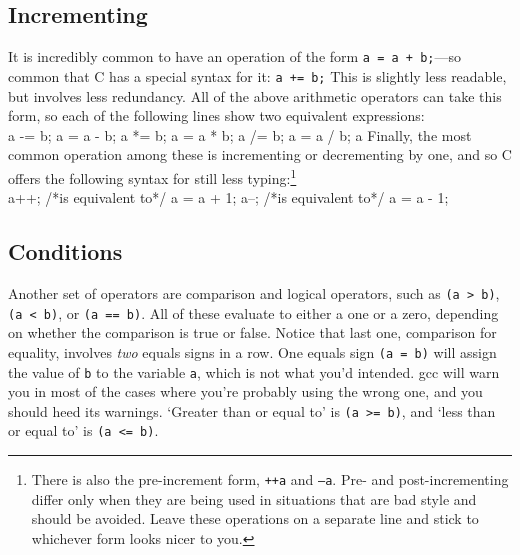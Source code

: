 \documentclass[12pt]{article}
\makeatletter
\def\ttindex#1{\index{#1@{\tt #1}}}
\makeatother
\begin{document}
\subsection{Incrementing} It is incredibly common to have an operation of the form {\tt a = a + b;}---so
common that C has a special syntax for it: {\tt a += b;} This is slightly less readable, but involves less
redundancy. All of the above arithmetic operators can take this form, so each of the following lines show two
equivalent expressions: \\
a -= b;     a = a - b;
a *= b;     a = a * b;
a /= b;     a = a / b;
a %
Finally, the most common operation among these is incrementing or decrementing by one, and so C offers the
following syntax for still less typing:\footnote{There is also the pre-increment form, {\tt ++a} and
{\tt --a}. Pre- and post-incrementing differ only when they are being used in situations that are bad style and should
be avoided. Leave these operations on a separate line and stick to whichever form looks nicer to you.} \\
a++; /*is equivalent to*/ a = a + 1;
a--; /*is equivalent to*/ a = a - 1;



\subsection{Conditions} 	
\label{forloops}    
\ttindex{<} \ttindex{>} \ttindex{==}
Another set of operators are comparison and logical operators, such as {\tt (a > b)},
{\tt (a < b)}, or {\tt (a == b)}. All of these evaluate to either a one or a zero, depending on whether the
comparison is true or false. Notice that last one, comparison for equality, involves {\sl two} equals
signs in a row. One equals sign {\tt (a = b)} will assign the value of {\tt b} to the variable {\tt a}, which is not what
you'd intended. gcc will warn you in most of the cases where you're
probably using the wrong one, and you should heed its warnings. `Greater than or equal to' is {\tt (a >=
b)}, and `less than or equal to' is {\tt (a <= b)}.
\end{document}
